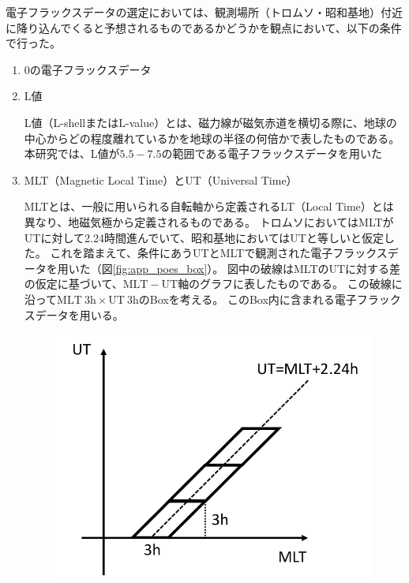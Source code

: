 電子フラックスデータの選定においては、観測場所（トロムソ・昭和基地）付近に降り込んでくると予想されるものであるかどうかを観点において、以下の条件で行った。
\begin{enumerate}
    \item 0\textdegree の電子フラックスデータ
    \item L値
    \par
    L値（L-shellまたはL-value）とは、磁力線が磁気赤道を横切る際に、地球の中心からどの程度離れているかを地球の半径の何倍かで表したものである。
    本研究では、L値が$5.5-7.5$の範囲である電子フラックスデータを用いた

    \item MLT（Magnetic Local Time）とUT（Universal Time）
    \par
    MLTとは、一般に用いられる自転軸から定義されるLT（Local Time）とは異なり、地磁気極から定義されるものである。
    トロムソにおいてはMLTがUTに対して2.24時間進んでいて、昭和基地においてはUTと等しいと仮定した。
    これを踏まえて、条件にあうUTとMLTで観測された電子フラックスデータを用いた（図\ref{fig:app_poes_box}）。
    図中の破線はMLTのUTに対する差の仮定に基づいて、$\mathrm{MLT}-\mathrm{UT}$軸のグラフに表したものである。
    この破線に沿って$\mathrm{MLT}\ 3\mathrm{h} \times \mathrm{UT}\ 3\mathrm{h}$のBoxを考える。
    このBox内に含まれる電子フラックスデータを用いる。
    \begin{figure}[htbp]
        \centering
        \begin{minipage}{.495\linewidth}
            \centering
            \includegraphics[scale=0.5]{master_thesis_contents/master_thesis_fig/app_poes_box_tromsoe.pdf}

\end{minipage}
\end{figure}
\end{enumerate}
